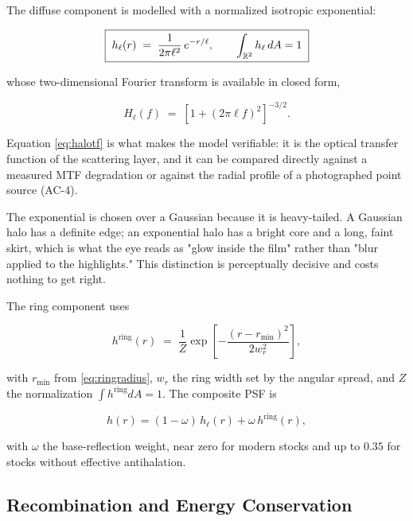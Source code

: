 The diffuse component is modelled with a normalized isotropic exponential:

\begin{equation}
\boxed{\;h_\ell(r) \;=\; \frac{1}{2\pi \ell^2}\, e^{-r/\ell}, \qquad \int_{\mathbb{R}^2} h_\ell \, dA = 1\;}
\label{eq:halpsf}
\end{equation}

whose two-dimensional Fourier transform is available in closed form,

\begin{equation}
H_\ell(f) \;=\; \left[1 + (2\pi \ell f)^2\right]^{-3/2}.
\label{eq:halotf}
\end{equation}

Equation \eqref{eq:halotf} is what makes the model verifiable: it is the optical
transfer function of the scattering layer, and it can be compared directly
against a measured MTF degradation or against the radial profile of a
photographed point source (AC-4).

The exponential is chosen over a Gaussian because it is heavy-tailed. A Gaussian
halo has a definite edge; an exponential halo has a bright core and a long,
faint skirt, which is what the eye reads as "glow inside the film" rather than
"blur applied to the highlights." This distinction is perceptually decisive and
costs nothing to get right.

The ring component uses

\begin{equation}
h^{\mathrm{ring}}(r) \;=\; \frac{1}{Z}\exp\!\left[-\frac{(r - r_{\min})^2}{2 w_r^2}\right],
\label{eq:halring}
\end{equation}

with $r_{\min}$ from \eqref{eq:ringradius}, $w_r$ the ring width set by the
angular spread, and $Z$ the normalization $\int h^{\mathrm{ring}} dA = 1$. The
composite PSF is

\begin{equation}
h(r) = (1 - \omega)\, h_\ell(r) + \omega\, h^{\mathrm{ring}}(r),
\end{equation}

with $\omega$ the base-reflection weight, near zero for modern stocks and up to
$0.35$ for stocks without effective antihalation.

\subsection{Recombination and Energy Conservation}

